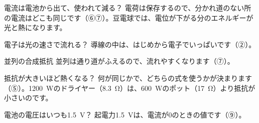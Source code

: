 \begin{tsumazuki}{電流は電池から出て、使われて減る？}
電荷は保存するので、分かれ道のない所の電流はどこも同じです（⑥⑦）。豆電球では、電位が下がる分のエネルギーが光と熱になります。
\end{tsumazuki}

\begin{tsumazuki}{電子は光の速さで流れる？}
導線の中は、はじめから電子でいっぱいです（②）。
\end{tsumazuki}

\begin{tsumazuki}{並列の合成抵抗}
並列は通り道がふえるので、流れやすくなります（⑦）。
\end{tsumazuki}

\begin{tsumazuki}{抵抗が大きいほど熱くなる？}
何が同じかで、どちらの式を使うかが決まります（⑤）。\qty{1200}{W}のドライヤー（\qty{8.3}{\ohm}）は、\qty{600}{W}のポット（\qty{17}{\ohm}）より抵抗が小さいのです。
\end{tsumazuki}

\begin{tsumazuki}{電池の電圧はいつも\qty{1.5}{V}？}
起電力\qty{1.5}{V}は、電流が0のときの値です（⑨）。
\end{tsumazuki}

